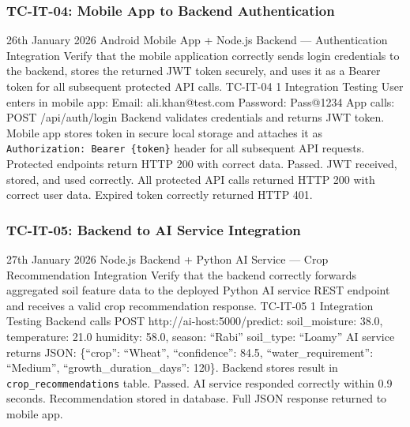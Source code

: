\subsubsection{TC-IT-04: Mobile App to Backend Authentication}

\testcase%
{26th January 2026}%
{Android Mobile App + Node.js Backend --- Authentication
Integration}%
{Verify that the mobile application correctly sends login
credentials to the backend, stores the returned JWT token
securely, and uses it as a Bearer token for all subsequent
protected API calls.}%
{TC-IT-04}%
{1}%
{Integration Testing}%
{User enters in mobile app: \newline
Email: ali.khan@test.com \newline
Password: Pass@1234 \newline
App calls: POST /api/auth/login}%
{Backend validates credentials and returns JWT token. Mobile
app stores token in secure local storage and attaches it
as \texttt{Authorization: Bearer \{token\}} header for all
subsequent API requests. Protected endpoints return HTTP
200 with correct data.}%
{Passed. JWT received, stored, and used correctly. All
protected API calls returned HTTP 200 with correct user
data. Expired token correctly returned HTTP 401.}

\subsubsection{TC-IT-05: Backend to AI Service Integration}

\testcase%
{27th January 2026}%
{Node.js Backend + Python AI Service --- Crop
Recommendation Integration}%
{Verify that the backend correctly forwards aggregated
soil feature data to the deployed Python AI service REST
endpoint and receives a valid crop recommendation
response.}%
{TC-IT-05}%
{1}%
{Integration Testing}%
{Backend calls POST http://ai-host:5000/predict: \newline
soil\_moisture: 38.0, temperature: 21.0 \newline
humidity: 58.0, season: ``Rabi'' \newline
soil\_type: ``Loamy''}%
{AI service returns JSON: \{``crop'': ``Wheat'',
``confidence'': 84.5, ``water\_requirement'': ``Medium'',
``growth\_duration\_days'': 120\}. Backend stores result
in \texttt{crop\_recommendations} table.}%
{Passed. AI service responded correctly within 0.9 seconds.
Recommendation stored in database. Full JSON response
returned to mobile app.}

